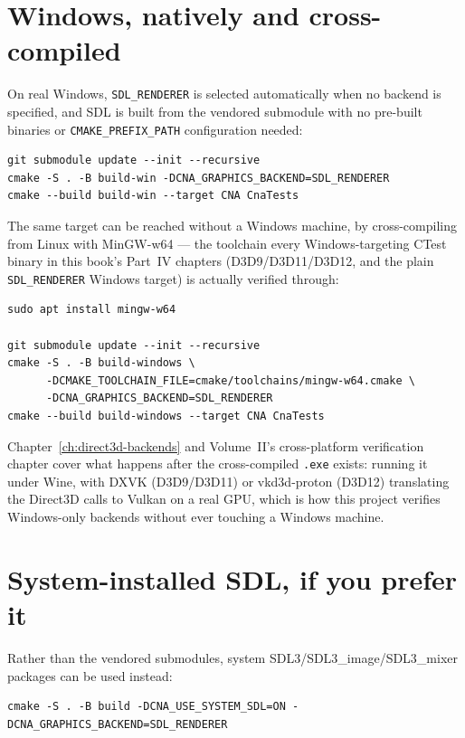 \section{Windows, natively and cross-compiled}

On real Windows, \texttt{SDL\_RENDERER} is selected automatically when no backend is
specified, and SDL is built from the vendored submodule with no pre-built binaries or
\texttt{CMAKE\_PREFIX\_PATH} configuration needed:

\begin{lstlisting}[style=cnashell]
git submodule update --init --recursive
cmake -S . -B build-win -DCNA_GRAPHICS_BACKEND=SDL_RENDERER
cmake --build build-win --target CNA CnaTests
\end{lstlisting}

The same target can be reached without a Windows machine, by cross-compiling from Linux with
MinGW-w64 --- the toolchain every Windows-targeting CTest binary in this book's Part~IV
chapters (D3D9/D3D11/D3D12, and the plain \texttt{SDL\_RENDERER} Windows target) is actually
verified through:

\begin{lstlisting}[style=cnashell]
sudo apt install mingw-w64

git submodule update --init --recursive
cmake -S . -B build-windows \
      -DCMAKE_TOOLCHAIN_FILE=cmake/toolchains/mingw-w64.cmake \
      -DCNA_GRAPHICS_BACKEND=SDL_RENDERER
cmake --build build-windows --target CNA CnaTests
\end{lstlisting}

Chapter~\ref{ch:direct3d-backends} and Volume~II's cross-platform verification chapter
cover what happens after the cross-compiled \texttt{.exe} exists: running it under Wine, with
DXVK (D3D9/D3D11) or vkd3d-proton (D3D12) translating the Direct3D calls to Vulkan on a real
GPU, which is how this project verifies Windows-only backends without ever touching a
Windows machine.

\section{System-installed SDL, if you prefer it}

Rather than the vendored submodules, system SDL3/SDL3\_image/SDL3\_mixer packages can be
used instead:

\begin{lstlisting}[style=cnashell]
cmake -S . -B build -DCNA_USE_SYSTEM_SDL=ON -DCNA_GRAPHICS_BACKEND=SDL_RENDERER
\end{lstlisting}

